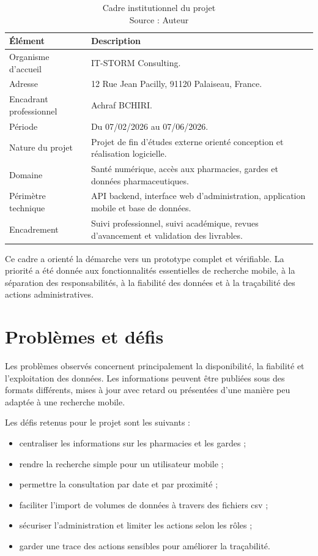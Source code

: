 \begin{table}[H]
    \centering
    \caption{Cadre institutionnel du projet\\ \small Source : Auteur}
    \label{tab:cadre-institutionnel}
    \begin{tabular}{L{4.5cm}L{8.5cm}}
        \toprule
        \textbf{Élément} & \textbf{Description} \\
        \midrule
        Organisme d'accueil & IT-STORM Consulting. \\
        Adresse & 12 Rue Jean Pacilly, 91120 Palaiseau, France. \\
        Encadrant professionnel & Achraf BCHIRI. \\
        Période & Du 07/02/2026 au 07/06/2026. \\
        Nature du projet & Projet de fin d'études externe orienté conception et réalisation logicielle. \\
        Domaine & Santé numérique, accès aux pharmacies, gardes et données pharmaceutiques. \\
        Périmètre technique & API backend, interface web d'administration, application mobile et base de données. \\
        Encadrement & Suivi professionnel, suivi académique, revues d'avancement et validation des livrables. \\
        \bottomrule
    \end{tabular}
\end{table}

Ce cadre a orienté la démarche vers un prototype complet et vérifiable. La priorité a été donnée aux
fonctionnalités essentielles de recherche mobile, à la séparation des responsabilités, à la fiabilité des
données et à la traçabilité des actions administratives.

\section{Problèmes et défis}

Les problèmes observés concernent principalement la disponibilité, la fiabilité et l'exploitation des
données. Les informations peuvent être publiées sous des formats différents, mises à jour avec retard ou
présentées d'une manière peu adaptée à une recherche mobile.

Les défis retenus pour le projet sont les suivants :

\begin{itemize}
    \item centraliser les informations sur les pharmacies et les gardes ;
    \item rendre la recherche simple pour un utilisateur mobile ;
    \item permettre la consultation par date et par proximité ;
    \item faciliter l'import de volumes de données à travers des fichiers \gls{csv} ;
    \item sécuriser l'administration et limiter les actions selon les rôles ;
    \item garder une trace des actions sensibles pour améliorer la traçabilité.
\end{itemize}

